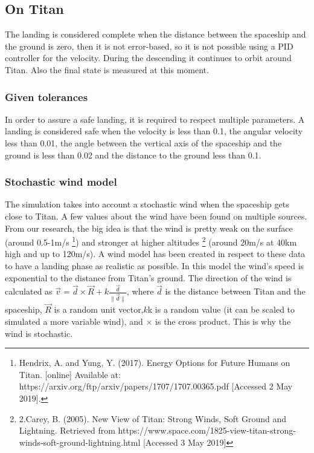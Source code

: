 \documentclass[10pt,a4paper]{article}
\begin{document}
	\subsection{On Titan}
	The landing is considered complete when the distance between the spaceship and the ground is zero, then it is not error-based, so it is not possible using a PID controller for the velocity. During the descending it continues to orbit around Titan. Also the final state is measured at this moment.
	
	\subsubsection{Given tolerances}
	In order to assure a safe landing, it is required to respect multiple parameters. A landing is considered safe when the velocity is less than 0.1, the angular velocity less than 0.01, the angle between the vertical axis of the spaceship and the ground is less than 0.02 and the distance to the ground less than 0.1.
	
	\subsubsection{Stochastic wind model}
	The simulation takes into account a stochastic wind when the spaceship gets close to Titan. A few values about the wind have been found on multiple sources.
	From our research, the big idea is that the wind is pretty weak on the surface (around 0.5-1m/s \footnote{Hendrix, A. and Yung, Y. (2017). Energy Options for Future Humans on Titan. [online] Available at: https://arxiv.org/ftp/arxiv/papers/1707/1707.00365.pdf [Accessed 2 May 2019].}) and stronger at higher altitudes \footnote{2.Carey, B. (2005). New View of Titan: Strong Winds, Soft Ground and Lightning. Retrieved from https://www.space.com/1825-view-titan-strong-winds-soft-ground-lightning.html [Accessed 3 May 2019]} (around 20m/s at 40km high and up to 120m/s). A wind model has been created in respect to these data to have a landing phase as realistic as possible. In this model the wind's speed is exponential to the distance from Titan's ground. The direction of the wind is calculated as $\vec{v} = \vec{d} \times \vec{R} + k \frac{\vec{d}}{\|\vec{d}\|}$, where $\vec{d}$ is the distance between Titan and the spaceship, $\vec{R}$ is a random unit vector,$k$k is a random value (it can be scaled to simulated a more variable wind), and $\times$ is the cross product. This is why the wind is stochastic.
	
\end{document}

